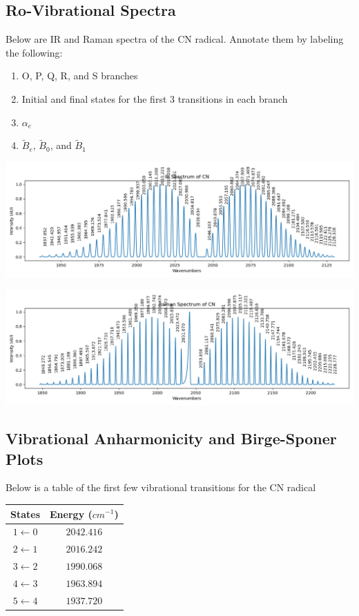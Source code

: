 \documentclass[11pt, letterpaper]{memoir}
\begin{document}
{\vspace{20em}
\subsection*{Ro-Vibrational Spectra}
Below are IR and Raman spectra of the CN radical. Annotate them by labeling the following:
\begin{enumerate}
	\item O, P, Q, R, and S branches
	\item Initial and final states for the first 3 transitions in each branch
	\item $\alpha_e$
	\item $\tilde{B}_e$, $\tilde{B}_0$, and $\tilde{B}_1$
\end{enumerate}

\noindent
\includegraphics[trim= 0 0 0 0, clip=true, width=\linewidth]{CN_IR}

\noindent
\includegraphics[trim= 0 0 0 0, clip=true, width=\linewidth]{CN_Raman}

\vspace{15em}
\subsection*{Vibrational Anharmonicity and Birge-Sponer Plots}
Below is a table of the first few vibrational transitions for the CN radical

\begin{tabular}{c|c}
	States         & Energy ($cm^{-1}$) \\ \midrule
	$1\leftarrow0$ & $2042.416$         \\
	$2\leftarrow1$ & $2016.242$         \\
	$3\leftarrow2$ & $1990.068$         \\
	$4\leftarrow3$ & $1963.894$         \\
	$5\leftarrow4$ & $1937.720$         \\
\end{tabular}

}
\end{document}

